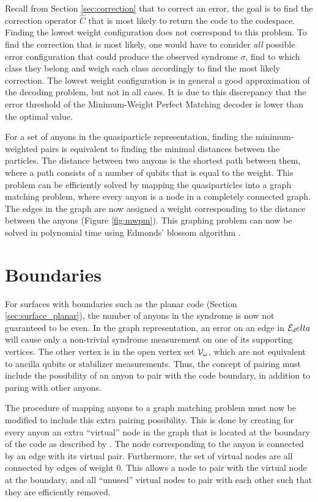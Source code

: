 Recall from Section \ref{sec:correction} that to correct an error, the goal is to find the correction operator $\hat{C}$ that is most likely to return the code to the codespace. Finding the lowest weight configuration does not correspond to this problem. To find the correction that is most likely, one would have to consider \emph{all} possible error configuration that could produce the observed syndrome $\sigma$, find to which class they belong and weigh each class accordingly to find the most likely correction. The lowest weight configuration is in general a good approximation of the decoding problem, but not in all cases. It is due to this discrepancy that the error threshold of the Minimum-Weight Perfect Matching decoder is lower than the optimal value. 

For a set of anyons in the quasiparticle representation, finding the minimum-weighted pairs is equivalent to finding the minimal distances between the particles. The distance between two anyons is the shortest path between them, where a path consists of a number of qubits that is equal to the weight. This problem can be efficiently solved by mapping the quasiparticles into a graph matching problem, where every anyon is a node in a completely connected graph. The edges in the graph are now assigned a weight corresponding to the distance between the anyons (Figure \ref{fig:mwpm}). This graphing problem can now be solved in polynomial time using Edmonds' blossom algorithm \cite{edmonds1965paths}. 



\section{Boundaries}\label{sec:mwpmboundaries}

For surfaces with boundaries such as the planar code (Section \ref{sec:surface_planar}), the number of anyons in the syndrome is now not guaranteed to be even. In the graph representation, an error on an edge in $\mathcal{E}_delta$ will cause only a non-trivial syndrome measurement on one of its supporting vertices. The other vertex is in the open vertex set $\mathcal{V}_\omega$, which are not equivalent to ancilla qubits or stabilizer measurements. Thus, the concept of pairing must include the possibility of an anyon to pair with the code boundary, in addition to paring with other anyons. 

The procedure of mapping anyons to a graph matching problem must now be modified to include this extra pairing possibility. This is done by creating for every anyon an extra ``virtual'' node in the graph that is located at the boundary of the code as described by \cite{wang2011surface}. The node corresponding to the anyon is connected by an edge with its virtual pair. Furthermore, the set of virtual nodes are all connected by edges of weight 0. This allows a node to pair with the virtual node at the boundary, and all ``unused'' virtual nodes to pair with each other such that they are efficiently removed. 

